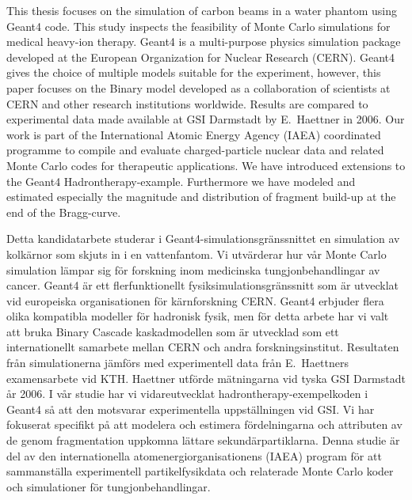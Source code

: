 
\makecoverpage

\begin{abstractpage}[english]
This thesis focuses on the simulation of carbon beams in a water phantom using Geant4 code. This study inspects the feasibility of Monte Carlo simulations for medical heavy-ion therapy. Geant4 is a multi-purpose physics simulation package developed at the European Organization for Nuclear Research (CERN). Geant4 gives the choice of multiple models suitable for the experiment, however, this paper focuses on the Binary model developed as a collaboration of scientists at CERN and other research institutions worldwide. Results are compared to experimental data made available at GSI Darmstadt by E.~Haettner in 2006. Our work is part of the International Atomic Energy Agency (IAEA) coordinated programme to compile and evaluate charged-particle nuclear data and related Monte Carlo codes for therapeutic applications. We have introduced extensions to the Geant4 Hadrontherapy-example. Furthermore we have modeled and estimated especially the magnitude and distribution of fragment build-up at the end of the Bragg-curve.
\end{abstractpage}
\begin{abstractpage}[swedish]
Detta kandidatarbete studerar i Geant4-simulationsgränssnittet en simulation av kolkärnor som skjuts in i en vattenfantom. Vi utvärderar hur vår Monte Carlo simulation lämpar sig för forskning inom medicinska tungjonbehandlingar av cancer. Geant4 är ett flerfunktionellt fysiksimulationsgränssnitt som är utvecklat vid europeiska organisationen för kärnforskning CERN. Geant4 erbjuder flera olika kompatibla modeller för hadronisk fysik, men för detta arbete har vi valt att bruka Binary Cascade kaskadmodellen som är utvecklad som ett internationellt samarbete mellan CERN och andra forskningsinstitut. Resultaten från simulationerna jämförs med experimentell data från E.~Haettners examensarbete vid KTH. Haettner utförde mätningarna vid tyska GSI Darmstadt år 2006. I vår studie har vi vidareutvecklat hadrontherapy-exempelkoden i Geant4 så att den motsvarar experimentella uppställningen vid GSI. Vi har fokuserat specifikt på att modelera och estimera fördelningarna och attributen av de genom fragmentation uppkomna lättare sekundärpartiklarna. Denna studie är del av den internationella atomenergiorganisationens (IAEA) program för att sammanställa experimentell partikelfysikdata och relaterade Monte Carlo koder och simulationer för tungjonbehandlingar.
\end{abstractpage}

